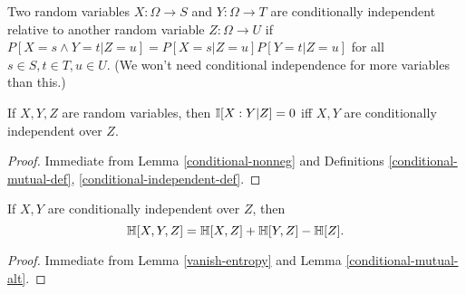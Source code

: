 \begin{definition}
\label{conditional-independent-def}
 \leanok
  Two random variables $X: \Omega \to S$ and $Y: \Omega \to T$ are conditionally independent relative to another random variable $Z: \Omega \to U$ if $P[ X = s \wedge Y = t| Z=u] = P[X=s|Z=u] P[Y=t|Z=u]$ for all $s \in S, t \in T, u \in U$.  (We won't need conditional independence for more variables than this.)
\end{definition}

\begin{lemma}\label{conditional-vanish}
  \leanok
  If $X,Y,Z$ are random variables, then $\mathbb{I}[X:Y|Z] = 0$ iff $X,Y$ are conditionally independent over $Z$.
\end{lemma}

\begin{proof}  Immediate from Lemma \ref{conditional-nonneg} and Definitions \ref{conditional-mutual-def}, \ref{conditional-independent-def}.
\end{proof}

\begin{corollary}\label{cond-trial-ent}
  \leanok
  If $X, Y$ are conditionally independent over $Z$, then
  $$ \mathbb{H}[X,Y,Z] =\mathbb{H}[X,Z] + \mathbb{H}[Y,Z] - \mathbb{H}[Z].$$
\end{corollary}

\begin{proof}  Immediate from Lemma \ref{vanish-entropy} and Lemma \ref{conditional-mutual-alt}.
\end{proof}
